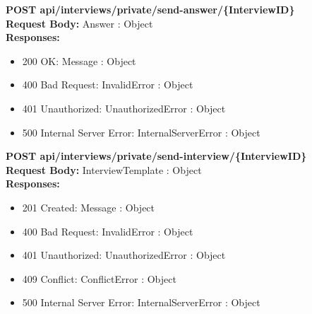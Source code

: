 \noindent\textbf{\color{titleColor}POST api/interviews/private/send-answer/\{InterviewID\}}
\vspace{2pt}
\\\textbf{\color{titleColor}Request Body:} Answer : Object 
\vspace{4pt}
\\\textbf{\color{titleColor}Responses:} 
\begin{itemize}
    \item {\color{titleColor}200 OK:} Message : Object
    \item {\color{titleColor}400 Bad Request:} InvalidError : Object
    \item {\color{titleColor}401 Unauthorized:} UnauthorizedError : Object
    \item {\color{titleColor}500 Internal Server Error:} InternalServerError : Object
\end{itemize}
\vspace{10pt}
\noindent{\color{titleColor}\rule{0.8\linewidth}{0.2mm}}
\vspace{10pt}

\noindent\textbf{\color{titleColor}POST api/interviews/private/send-interview/\{InterviewID\}}
\vspace{2pt}
\\\textbf{\color{titleColor}Request Body:} InterviewTemplate : Object 
\vspace{4pt}
\\\textbf{\color{titleColor}Responses:} 
\begin{itemize}
    \item {\color{titleColor}201 Created:} Message : Object
    \item {\color{titleColor}400 Bad Request:} InvalidError : Object
    \item {\color{titleColor}401 Unauthorized:} UnauthorizedError : Object
    \item {\color{titleColor}409 Conflict:} ConflictError : Object
    \item {\color{titleColor}500 Internal Server Error:} InternalServerError : Object
\end{itemize}
\vspace{10pt}
\noindent{\color{titleColor}\rule{0.8\linewidth}{0.2mm}}
\vspace{10pt}

